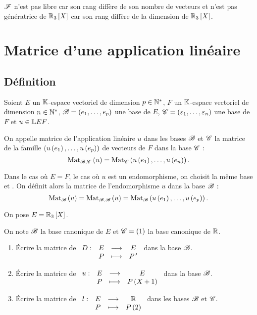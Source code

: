 \begin{corr}[3]
\(\mathscr{F}\) n'est pas libre car son rang diffère de son nombre de vecteurs et n'est pas génératrice de \(\polydeg[\R]{3}\) car son rang diffère de la dimension de \(\polydeg[\R]{3}\).
\end{corr}

\section{Matrice d'une application linéaire}

\subsection{Définition}

\begin{defi}
Soient \(E\) un \(\mathbb{K}\)-espace vectoriel de dimension \(p\in\mathbb{N}^*\), \(F\) un \(\mathbb{K}\)-espace vectoriel de dimension \(n\in\mathbb{N}^*\), \(\mathscr{B}=\left(e_1,\dots,e_p\right)\) une base de \(E\), \(\mathscr{C}=\left(\varepsilon_1,\dots,\varepsilon_n\right)\) une base de \(F\) et \(u\in\mathbb{L}{E}{F}\).

On appelle matrice de l'application linéaire \(u\) dans les bases \(\mathscr{B}\) et \(\mathscr{C}\) la matrice de la famille \(\left(u\left(e_1\right),\dots,u\left(e_p\right)\right)\) de vecteurs de \(F\) dans la base \(\mathscr{C}\) : \[\Mat[\fami{B},\fami{C}]{u}=\Mat[\fami{C}]{u\paren{e_1},\dots,u\paren{e_n}}.\]

Dans le cas où \(E=F\), \cad le cas où \(u\) est un endomorphisme, on choisit la même base  et . On définit alors la matrice de l'endomorphisme \(u\) dans la base \(\mathscr{B}\) : \[\Mat{u}=\Mat[\fami{B},\fami{B}]{u}=\Mat{u\paren{e_1},\dots,u\paren{e_p}}.\]
\end{defi}

\begin{exoex}
On pose \(E=\polydeg[\R]{3}\).

On note \(\mathscr{B}\) la base canonique de \(E\) et \(\mathscr{C}=\left(1\right)\) la base canonique de \(\mathbb{R}\).

\begin{enumerate}
    \item Écrire la matrice de \(\begin{array}[t]{cccc}D : & E & \longrightarrow & E \\ & P & \longmapsto & P^{\,\prime}\end{array}\) dans la base \(\mathscr{B}\). \\
    \item Écrire la matrice de \(\begin{array}[t]{cccc}u : & E & \longrightarrow & E \\ & P & \longmapsto & P\left(X+1\right)\end{array}\) dans la base \(\mathscr{B}\). \\
    \item Écrire la matrice de \(\begin{array}[t]{cccc}l : & E & \longrightarrow & \mathbb{R} \\ & P & \longmapsto & P\left(2\right)\end{array}\) dans les bases \(\mathscr{B}\) et \(\mathscr{C}\).
\end{enumerate}
\end{exoex}

